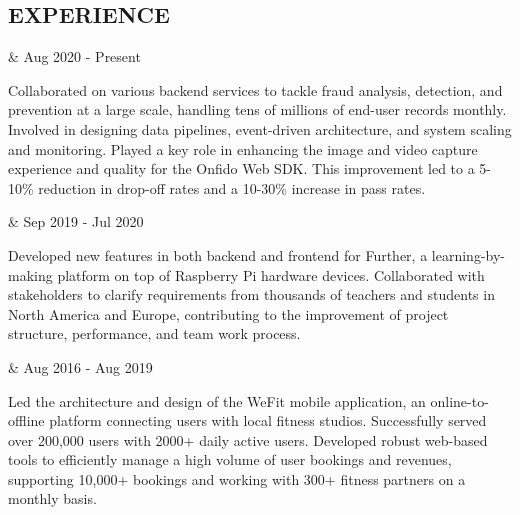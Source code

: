 \subsection*{EXPERIENCE}

\begin{workexp}
   \at \href{https://onfido.com/}{}  &
  Aug 2020 - Present
\end{workexp}

\tbullet Collaborated on various backend services to tackle fraud analysis, detection, and prevention at a large scale, handling tens of millions of end-user records monthly. Involved in designing data pipelines, event-driven architecture, and system scaling and monitoring. \newline
\tbullet Played a key role in enhancing the image and video capture experience and quality for the Onfido Web SDK. This improvement led to a 5-10\% reduction in drop-off rates and a 10-30\% increase in pass rates. \newline

\begin{workexp}
   \at \href{https://www.pi-top.com/}{}  &
  Sep 2019 - Jul 2020 
\end{workexp}

\tbullet Developed new features in both backend and frontend for Further, a learning-by-making platform on top of Raspberry Pi hardware devices. \newline
\tbullet Collaborated with stakeholders to clarify requirements from thousands of teachers and students in North America and Europe, contributing to the improvement of project structure, performance, and team work process. \newline

\begin{workexp}
   \at \href{https://youtu.be/_FhxbwNqGS8}{}  &
  Aug 2016 - Aug 2019 
\end{workexp}

\tbullet Led the architecture and design of the WeFit mobile application, an online-to-offline platform connecting users with local fitness studios. Successfully served over 200,000 users with 2000+ daily active users. \newline
\tbullet Developed robust web-based tools to efficiently manage a high volume of user bookings and revenues, supporting 10,000+ bookings and working with 300+ fitness partners on a monthly basis. \newline

